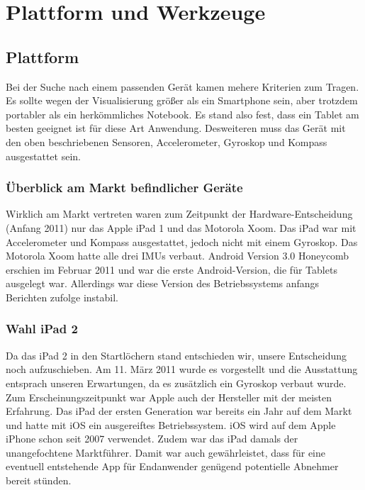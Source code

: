 
\chapter{Plattform und Werkzeuge}
  \label{Plattform und Werkzeuge}
  
  \section{Plattform}
  
  \medskip
Bei der Suche nach einem passenden Gerät kamen mehere Kriterien zum Tragen. Es sollte wegen der Visualisierung größer als ein Smartphone sein, aber trotzdem portabler als ein herkömmliches Notebook. Es stand also fest, dass ein Tablet am besten geeignet ist für diese Art Anwendung. Desweiteren muss das Gerät mit den oben beschriebenen Sensoren, Accelerometer, Gyroskop und Kompass ausgestattet sein.

	\subsection{Überblick am Markt befindlicher Geräte}
Wirklich am Markt vertreten waren zum Zeitpunkt der Hardware-Entscheidung (Anfang 2011) nur das Apple iPad 1 und das Motorola Xoom. Das iPad war mit Accelerometer und Kompass ausgestattet, jedoch nicht mit einem Gyroskop. Das Motorola Xoom hatte alle drei IMUs verbaut. Android Version 3.0 Honeycomb erschien im Februar 2011 und war die erste Android-Version, die für Tablets ausgelegt war. \cite{ wiki:005} Allerdings war diese Version des Betriebssystems anfangs Berichten zufolge instabil.
	
	\subsection{Wahl iPad 2}
	Da das iPad 2 in den Startlöchern stand entschieden wir, unsere Entscheidung noch aufzuschieben. Am 11. März 2011 wurde es vorgestellt und die Ausstattung entsprach unseren Erwartungen, da es zusätzlich ein Gyroskop verbaut wurde. Zum Erscheinungszeitpunkt war Apple auch der Hersteller mit der meisten Erfahrung. Das iPad der ersten Generation war bereits ein Jahr auf dem Markt und hatte mit iOS ein ausgereiftes Betriebssystem. iOS wird auf dem Apple iPhone schon seit 2007 verwendet. Zudem war das iPad damals der unangefochtene Marktführer. Damit war auch gewährleistet, dass für eine eventuell entstehende App für Endanwender genügend potentielle Abnehmer bereit stünden.
	

